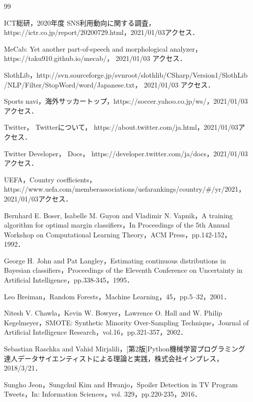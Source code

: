 \begin{thebibliography}{99}
{\normalsize

 ICT総研，2020年度 SNS利用動向に関する調査，https://ictr.co.jp/report/20200729.html，2021/01/03アクセス．

MeCab: Yet another part-of-speech and morphological analyzer，https://taku910.github.io/mecab/， 2021/01/03 アクセス．

SlothLib，http://svn.sourceforge.jp/svnroot/slothlib/CSharp/Version1/SlothLib\\/NLP/Filter/StopWord/word/Japanese.txt， 2021/01/03 アクセス．

Sports navi，海外サッカートップ，https://soccer.yahoo.co.jp/ws/，2021/01/03アクセス．

Twitter， Twitterについて， https://about.twitter.com/ja.html，2021/01/03アクセス．

Twitter Developer， Docs， https://developer.twitter.com/ja/docs，2021/01/03アクセス．

UEFA，Country coefficients，\\https://www.uefa.com/memberassociations/uefarankings/country/\#/yr/2021，2021/01/03アクセス．

 Bernhard E. Boser, Isabelle M. Guyon and Vladimir N. Vapnik，A training algorithm for optimal margin classifiers，In Proceedings of the 5th Annual Workshop on Computational Learning Theory，ACM Press，pp.142-152，1992．

 George H. John and Pat Langley，Estimating continuous distributions in Bayesian classifiers，Proceedings of the Eleventh Conference on Uncertainty in Artificial Intelligence，pp.338-345，1995．

 Leo Breiman，Random Forests，Machine Learning，45，pp.5–32，2001．

 Nitesh V. Chawla，Kevin W. Bowyer，Lawrence O. Hall and W. Philip Kegelmeyer，SMOTE: Synthetic Minority Over-Sampling Technique，Journal of Artificial Intelligence Research，vol.16，pp.321-357，2002．

 Sebastian Raschka and Vahid Mirjalili，[第2版]Python機械学習プログラミング達人データサイエンティストによる理論と実践，株式会社インプレス，2018/3/21．

 Sungho Jeon，Sungchul Kim and Hwanjo，Spoiler Detection in TV Program Tweets，In: Information Sciences，vol. 329，pp.220-235，2016．

}
\end{thebibliography}
